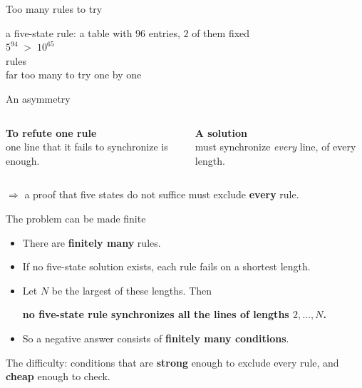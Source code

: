 
\begin{frame}{Too many rules to try}
\begin{center}
\vspace{2ex}
{\large a five-state rule: a table with $96$ entries, $2$ of them fixed}\\[3ex]
{\Huge $5^{94}\;>\;10^{65}$}\\[1ex]
{\large rules}\\[3ex]
{\color{mute} far too many to try one by one}
\end{center}
\end{frame}

\begin{frame}{An asymmetry}
\vspace{3ex}
\begin{columns}[T]
\begin{plainbox}\textbf{To refute one rule}\\ one line that it fails to synchronize is enough.\end{plainbox}
\begin{plainbox}\textbf{A solution}\\ must synchronize \emph{every} line, of every length.\end{plainbox}
\end{columns}
\vspace{4ex}
\begin{center}\large $\Rightarrow$ a proof that five states do not suffice must exclude \textbf{every} rule.\end{center}
\end{frame}

\begin{frame}{The problem can be made finite}
\begin{itemize}
\item There are \textbf{finitely many} rules.
\item If no five-state solution exists, each rule fails on a shortest length.
\item Let $N$ be the largest of these lengths. Then
\begin{center}\textbf{no five-state rule synchronizes all the lines of lengths $2,\dots,N$.}\end{center}
\item So a negative answer consists of \textbf{finitely many conditions}.
\end{itemize}
\vspace{2ex}
\begin{plainbox}The difficulty: conditions that are \textbf{strong} enough to exclude every rule, and \textbf{cheap} enough to check.\end{plainbox}
\end{frame}

